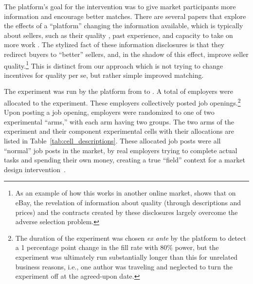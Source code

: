 \documentclass[12pt]{article}
\begin{document}
The platform's goal for the intervention was to give market participants more information and encourage better matches.
There are several papers that explore the effects of a ``platform'' changing the information available, which is typically about sellers, such as their quality \citep{luca2016reviews, jin2003}, past experience, \citep{barach2016info} and capacity to take on more work \citep{horton2018scs}.
The stylized fact of these information disclosures is that they redirect buyers to ``better'' sellers, and, in the shadow of this effect, improve seller quality.\footnote{
  As an example of how this works in another online market, \cite{lewis2011} shows that on eBay, the revelation of information about quality (through descriptions and prices) and the contracts created by these disclosures largely overcome the adverse selection problem.
}
This is distinct from our approach which is not trying to change incentives for quality per se, but rather simple improved matching. 

The experiment was run by the platform from \expStart{} to \expEnd{}. 
A total of \totalOpeningCount{} employers were allocated to the experiment.
These employers collectively posted \totalOpeningCountMultiple{} job openings.\footnote{ 
  The duration of the experiment was chosen \emph{ex ante} by the platform to detect a 1 percentage point change in the fill rate with 80\% power, but the experiment was ultimately run substantially longer than this for unrelated business reasons, i.e., one author was traveling and neglected to turn the experiment off at the agreed-upon date. 
}
Upon posting a job opening, employers were randomized to one of two experimental ``arms,'' with each arm having two groups. 
The two arms of the experiment and their component experimental cells with their allocations are listed in Table~\ref{tab:cell_descriptions}. 
These allocated job posts were all ``normal'' job posts in the market, by real employers trying to complete actual tasks and spending their own money, creating a true ``field'' context for a market design intervention~\citep{harrison2004}. 
\end{document}

